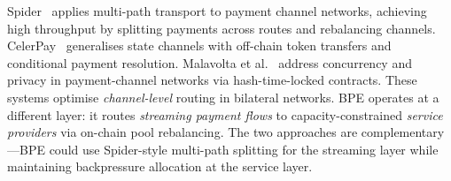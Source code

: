 Spider~\cite{sivaraman2020spider} applies multi-path transport to payment channel
networks, achieving high throughput by splitting payments across routes and rebalancing
channels. CelerPay~\cite{dong2020celer} generalises state channels with off-chain
token transfers and conditional payment resolution. Malavolta et al.~\cite{malavolta2017concurrency}
address concurrency and privacy in payment-channel networks via hash-time-locked contracts.
These systems optimise \emph{channel-level} routing in bilateral networks. BPE operates
at a different layer: it routes \emph{streaming payment flows} to capacity-constrained
\emph{service providers} via on-chain pool rebalancing. The two approaches are
complementary---BPE could use Spider-style multi-path splitting for the streaming
layer while maintaining backpressure allocation at the service layer.
